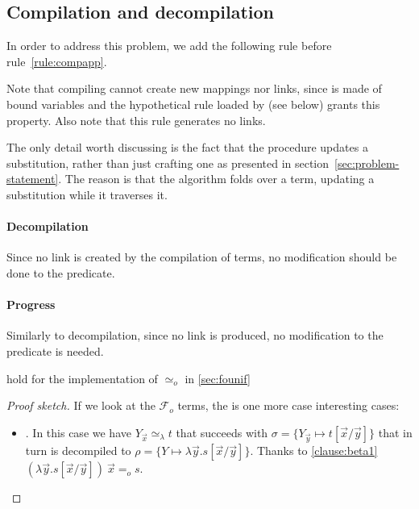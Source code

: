 \documentclass[sigconf,natbib=false,review]{acmart}
\newcommand{\EqualRel}{\ensuremath{=}}
\newcommand{\UnifRel}{\ensuremath{\simeq}}
\newcommand{\Uo}{\texorpdfstring{\ensuremath{\UnifRel_o}\xspace}{unif\_o}}
\newcommand{\Eo}{\ensuremath{\EqualRel_o}\xspace}
\newcommand{\Ue}{\ensuremath{\UnifRel_\lambda}\xspace}
\newcommand{\Fo}{\texorpdfstring{\ensuremath{\mathcal{F}_{\!o}\xspace}}{Fo}} %
\begin{document}
\subsection{Compilation and decompilation}

In order to address this problem, we add the following rule before rule~\ref{rule:compapp}.



\noindent
Note that compiling  cannot create new mappings nor links, since 
is made of bound variables and the hypothetical rule loaded by 
(see below) grants this property. Also note that this rule generates no links.


\noindent
The only detail worth discussing is the fact that the procedure updates a
substitution, rather than just crafting one as presented in
section~\ref{sec:problem-statement}. The reason is that the algorithm folds
over a term, updating a substitution while it traverses it.

\paragraph{Decompilation} Since no link is created by the compilation of 
\maybebeta terms, no modification should be done
to the  predicate.

\paragraph{Progress} Similarly to decompilation, since no link is produced,
no modification to the  predicate is needed.

\begin{lemma}
   hold for the implementation of \Uo
  in \cref{sec:founif}
  \end{lemma}
  \begin{proof}[Proof sketch]
  If we look at the \Fo{} terms, the is one more case interesting cases:
  \begin{itemize}
  \item \elpiIn{fapp[fuva X|L] ~\Uo~s}. In this case
   we have $Y_{\vec{x}} \Ue t$ that succeeds with
   $\sigma = \{ Y_{\vec{y}} \mapsto t[\vec{x}/\vec{y}]\}$ that in turn
   is decompiled to $\rho = \{ Y \mapsto \lambda \vec{y}.s[\vec{x}/\vec{y}]\}$.
   Thanks to \ref{clause:beta1}
   $(\lambda \vec{y}.s[\vec{x}/\vec{y}])~\vec{x} \Eo s$.
  \end{itemize}
  \end{proof}
  
\end{document}

